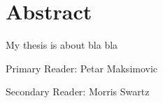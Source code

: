 \chapter*{Abstract}

My thesis is about bla bla

\noindent Primary Reader: Petar Maksimovic

\noindent Secondary Reader: Morris Swartz